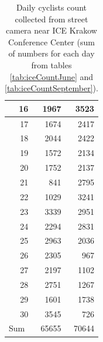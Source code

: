 \begin{table}[H]
\begin{tabular}{|r|r|r|}
16                                     & 1967                      & 3523                           \\ \hline
17                                     & 1674                      & 2417                           \\ \hline
18                                     & 2044                      & 2422                           \\ \hline
19                                     & 1572                      & 2134                           \\ \hline
20                                     & 1752                      & 2137                           \\ \hline
21                                     & 841                       & 2795                           \\ \hline
22                                     & 1029                      & 3241                           \\ \hline
23                                     & 3339                      & 2951                           \\ \hline
24                                     & 2294                      & 2831                           \\ \hline
25                                     & 2963                      & 2036                           \\ \hline
26                                     & 2305                      & 967                            \\ \hline
27                                     & 2197                      & 1102                           \\ \hline
28                                     & 2751                      & 1267                           \\ \hline
29                                     & 1601                      & 1738                           \\ \hline
30                                     & 3545                      & 726                            \\ \hline
\multicolumn{1}{|l|}{Sum}              & 65655                     & 70644                          \\ \hline
\end{tabular}
\caption{Daily cyclists count collected from street camera near ICE Krakow Conference Center (sum of numbers for each day from tables \ref{tab:iceCountJune} and \ref{tab:iceCountSeptember}).}
\label{tab:iceDaily}
\end{table}


